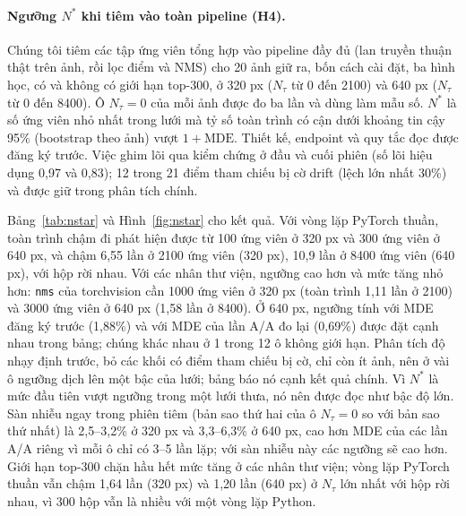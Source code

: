 \documentclass[a4paper,fleqn]{cas-dc}
\newcommand{\Ntau}{N_{\tau}}
\begin{document}
\paragraph{Ngưỡng $N^{*}$ khi tiêm vào toàn pipeline (H4).}
Chúng tôi tiêm các tập ứng viên tổng hợp vào pipeline đầy đủ (lan truyền thuận thật trên ảnh, rồi lọc điểm và NMS) cho 20 ảnh giữ ra, bốn cách cài đặt, ba hình học, có và không có giới hạn top-300, ở 320 px ($\Ntau$ từ 0 đến 2100) và 640 px ($\Ntau$ từ 0 đến 8400). Ô $\Ntau=0$ của mỗi ảnh được đo ba lần và dùng làm mẫu số. $N^{*}$ là số ứng viên nhỏ nhất trong lưới mà tỷ số toàn trình có cận dưới khoảng tin cậy 95\% (bootstrap theo ảnh) vượt $1+\mathrm{MDE}$. Thiết kế, endpoint và quy tắc đọc được đăng ký trước. Việc ghim lõi qua kiểm chứng ở đầu và cuối phiên (số lõi hiệu dụng 0,97 và 0,83); 12 trong 21 điểm tham chiếu bị cờ drift (lệch lớn nhất 30\%) và được giữ trong phân tích chính.

Bảng~\ref{tab:nstar} và Hình~\ref{fig:nstar} cho kết quả. Với vòng lặp PyTorch thuần, toàn trình chậm đi phát hiện được từ 100 ứng viên ở 320 px và 300 ứng viên ở 640 px, và chậm 6,55 lần ở 2100 ứng viên (320 px), 10,9 lần ở 8400 ứng viên (640 px), với hộp rời nhau. Với các nhân thư viện, ngưỡng cao hơn và mức tăng nhỏ hơn: \texttt{nms} của torchvision cần 1000 ứng viên ở 320 px (toàn trình 1,11 lần ở 2100) và 3000 ứng viên ở 640 px (1,58 lần ở 8400). Ở 640 px, ngưỡng tính với MDE đăng ký trước (1,88\%) và với MDE của lần A/A đo lại (0,69\%) được đặt cạnh nhau trong bảng; chúng khác nhau ở 1 trong 12 ô không giới hạn. Phân tích độ nhạy định trước, bỏ các khối có điểm tham chiếu bị cờ, chỉ còn ít ảnh, nên ở vài ô ngưỡng dịch lên một bậc của lưới; bảng báo nó cạnh kết quả chính. Vì $N^{*}$ là mức đầu tiên vượt ngưỡng trong một lưới thưa, nó nên được đọc như bậc độ lớn. Sàn nhiễu ngay trong phiên tiêm (bản sao thứ hai của ô $\Ntau=0$ so với bản sao thứ nhất) là 2,5--3,2\% ở 320 px và 3,3--6,3\% ở 640 px, cao hơn MDE của các lần A/A riêng vì mỗi ô chỉ có 3--5 lần lặp; với sàn nhiễu này các ngưỡng sẽ cao hơn. Giới hạn top-300 chặn hầu hết mức tăng ở các nhân thư viện; vòng lặp PyTorch thuần vẫn chậm 1,64 lần (320 px) và 1,20 lần (640 px) ở $\Ntau$ lớn nhất với hộp rời nhau, vì 300 hộp vẫn là nhiều với một vòng lặp Python.
\end{document}
